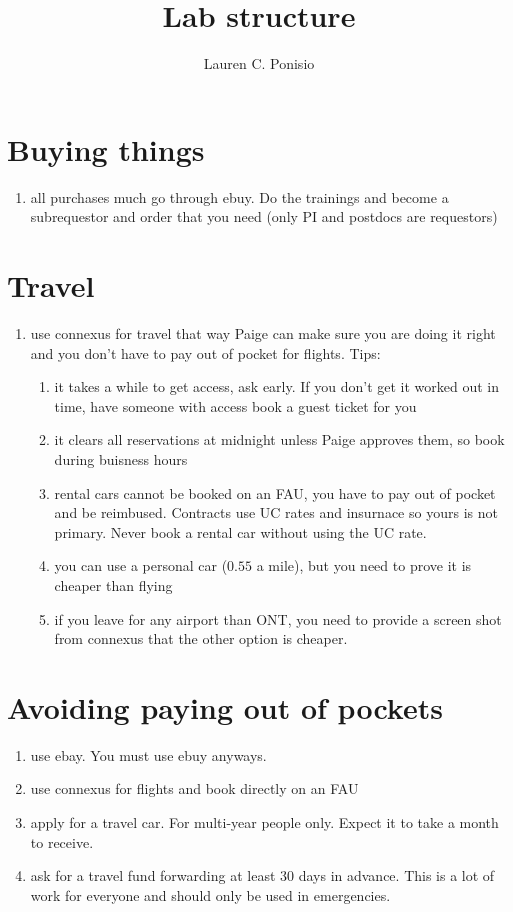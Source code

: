 \documentclass[12pt]{article}
\title{Lab structure}
\author{Lauren C. Ponisio}
\begin{document}
\maketitle

\section{Buying things}
\begin{enumerate}
\item all purchases much go through ebuy. Do the trainings and become
  a subrequestor and order that you need (only PI and postdocs are
  requestors)
\end{enumerate}

\section{Travel}
\begin{enumerate}
\item use connexus for travel that way Paige can make sure you are
  doing it right and you don't have to pay out of pocket for
  flights. Tips:
  \begin{enumerate}
  \item it takes a while to get access, ask early. If you don't get
    it worked out in time, have someone with access book a guest
    ticket for you
  \item it clears all reservations at midnight unless Paige approves
    them, so book during buisness hours
  \item rental cars cannot be booked on an FAU, you have to pay out
    of pocket and be reimbused. Contracts use UC rates and insurnace
    so yours is not primary. Never book a rental car without using
    the UC rate.
  \item you can use a personal car ($0.55$ a mile), but you need to
    prove it is cheaper than flying
  \item if you leave for any airport than ONT, you need to provide a
    screen shot from connexus that the other option is cheaper.
  \end{enumerate}      
\end{enumerate}

\section{Avoiding paying out of pockets}
\begin{enumerate}
\item use ebay. You must use ebuy anyways. 
\item use connexus for flights and book directly on an FAU
\item apply for a travel car. For multi-year people only. Expect it to
  take a month to receive.
\item ask for a travel fund forwarding at least 30 days in
  advance. This is a lot of work for everyone and should only be
  used in emergencies. 
\end{enumerate}
\end{document}
